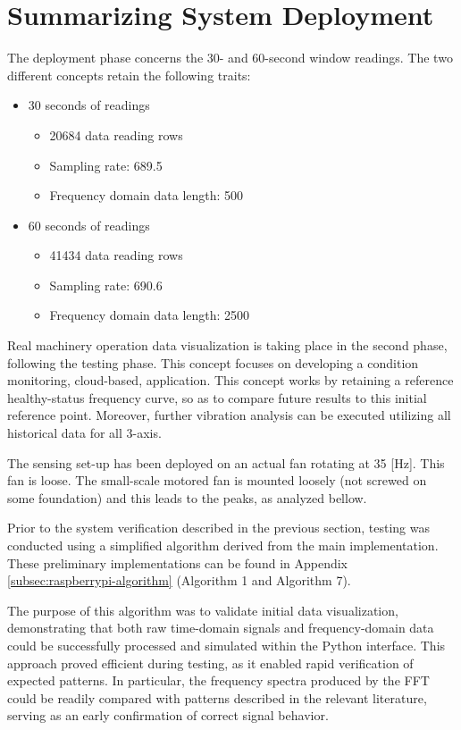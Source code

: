 \section{Summarizing System Deployment}
{
	The deployment phase concerns the 30- and 60-second window readings. The two different concepts retain the following traits:
	
	\begin{itemize}
		\item 30 seconds of readings 
		    \begin{itemize}
				\item 20684 data reading rows
				\item Sampling rate: 689.5
				\item Frequency domain data length: 500
			\end{itemize}
		\item 60 seconds of readings 
			\begin{itemize}
				\item 41434 data reading rows
				\item Sampling rate: 690.6
				\item Frequency domain data length: 2500
			\end{itemize}
	\end{itemize}
	
	
	
	Real machinery operation data visualization is taking place in the second phase, following the testing phase. This concept focuses on developing a condition monitoring, cloud-based, application. This concept works by retaining a reference healthy-status frequency curve, so as to compare future results to this initial reference point. Moreover, further vibration analysis can be executed utilizing all historical data for all 3-axis.
	
	The sensing set-up has been deployed on an actual fan rotating at 35 [Hz]. This fan is loose. The small-scale motored fan is mounted loosely (not screwed on some foundation) and this leads to the peaks, as analyzed bellow.
	
	Prior to the system verification described in the previous section, testing was conducted using a simplified algorithm derived from the main implementation. These preliminary implementations can be found in Appendix \ref{subsec:raspberrypi-algorithm} (Algorithm 1 and Algorithm 7).
	
	The purpose of this algorithm was to validate initial data visualization, demonstrating that both raw time-domain signals and frequency-domain data could be successfully processed and simulated within the Python interface. This approach proved efficient during testing, as it enabled rapid verification of expected patterns. In particular, the frequency spectra produced by the FFT could be readily compared with patterns described in the relevant literature, serving as an early confirmation of correct signal behavior.
	
}
